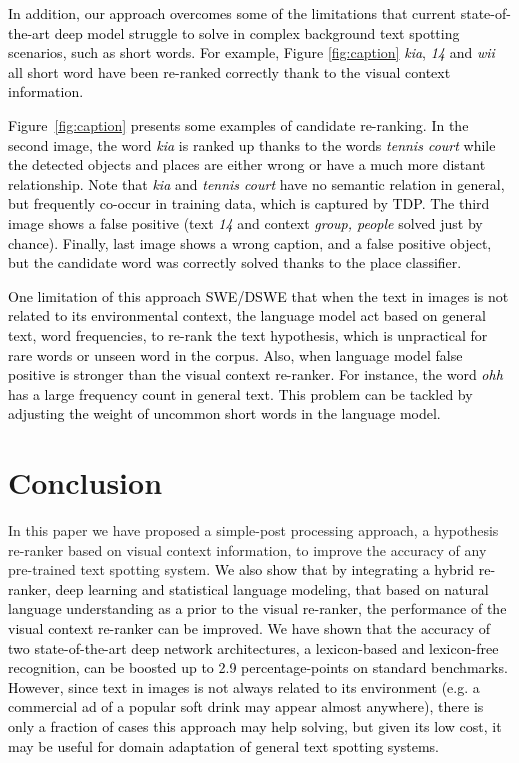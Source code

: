 \documentclass[phd,tocprelim]{cornell}
\begin{document}
\textcolor{black}{In addition, our approach overcomes some of the limitations that current state-of-the-art deep model struggle to solve in complex background text spotting scenarios, such as short words. For example,  Figure \ref{fig:caption} \textit{kia}, \textit{14} and \textit{wii} all short word have been re-ranked correctly thank to the visual context information.}

\textcolor{black}{Figure~\ref{fig:caption} presents some examples of candidate re-ranking. In the second image,  the word \textit{kia} is ranked up thanks to the words \textit{tennis court} while the detected objects and places are either wrong or have a much more distant relationship. Note that \textit{kia} and \textit{tennis court} have no semantic relation in general, but frequently co-occur in training data, which is captured by TDP. The third image shows a false positive (text \textit{14} and context \textit{group, people} solved just by chance). Finally, last image shows a wrong caption, and a false positive object, but the candidate word was correctly solved thanks to the place classifier.}
 
\textcolor{black}{One limitation of this approach SWE/DSWE that when the text in images is not related to its environmental context, the language model act based on general text, word frequencies, to re-rank the text hypothesis,  which is unpractical for rare words or unseen word in the corpus. Also, when language model false positive is stronger than the visual context re-ranker. For instance,  the word \textit{ohh} has a large frequency count in general text. This problem can be tackled by adjusting the weight of uncommon short words in the language model.} 



\section{Conclusion}

In this paper we have proposed a simple-post processing approach, a hypothesis re-ranker based on visual context information, to improve the accuracy of any pre-trained text spotting system. \textcolor{black}{We  also show that by integrating a hybrid re-ranker, deep learning and statistical language modeling, that based on natural language understanding as a prior to the visual re-ranker, the performance of the visual context re-ranker can be improved. We have shown that the accuracy of two state-of-the-art deep network architectures, a lexicon-based and lexicon-free recognition, can be boosted up to 2.9 percentage-points on standard benchmarks. However, since text in images is not always related to its environment (e.g. a commercial ad of a popular soft drink may appear almost anywhere), there is only a fraction of cases this approach may help solving, but given its low cost, it may be useful for domain adaptation of general text spotting systems.}
\end{document}
